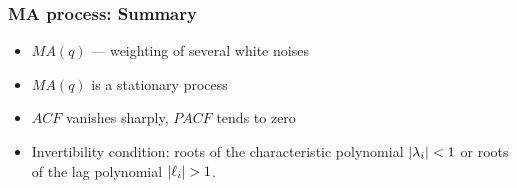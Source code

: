 \begin{frame}
\frametitle{MA process: Summary}
	
	\begin{itemize}[<+->]
		\item $MA(q)$ — weighting of several white noises
		\item $MA(q)$ is a stationary process
		\item $ACF$ vanishes sharply, $PACF$ tends to zero
 		\item Invertibility condition: roots of the characteristic polynomial $\abs{\lambda_i} < 1$ or 
		roots of the lag polynomial $\abs{\ell_i} > 1$.
	\end{itemize}
\end{frame}
